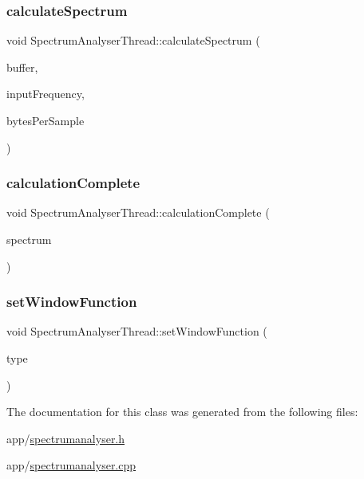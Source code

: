 \subsubsection{\texorpdfstring{calculate\+Spectrum}{calculateSpectrum}}
{\footnotesize\ttfamily void Spectrum\+Analyser\+Thread\+::calculate\+Spectrum (\begin{DoxyParamCaption}\item[{const Q\+Byte\+Array \&}]{buffer,  }\item[{int}]{input\+Frequency,  }\item[{int}]{bytes\+Per\+Sample }\end{DoxyParamCaption})\hspace{0.3cm}{\ttfamily [slot]}}

\hypertarget{class_spectrum_analyser_thread_adb2c9b6a5e017cd0805dac29c754b7f0}{}\label{class_spectrum_analyser_thread_adb2c9b6a5e017cd0805dac29c754b7f0} 
\subsubsection{\texorpdfstring{calculation\+Complete}{calculationComplete}}
{\footnotesize\ttfamily void Spectrum\+Analyser\+Thread\+::calculation\+Complete (\begin{DoxyParamCaption}\item[{const \hyperlink{class_frequency_spectrum}{Frequency\+Spectrum} \&}]{spectrum }\end{DoxyParamCaption})\hspace{0.3cm}{\ttfamily [signal]}}

\hypertarget{class_spectrum_analyser_thread_a823681736ef2719fbb6aec132a75b6cb}{}\label{class_spectrum_analyser_thread_a823681736ef2719fbb6aec132a75b6cb} 
\subsubsection{\texorpdfstring{set\+Window\+Function}{setWindowFunction}}
{\footnotesize\ttfamily void Spectrum\+Analyser\+Thread\+::set\+Window\+Function (\begin{DoxyParamCaption}\item[{\hyperlink{spectrum_8h_adae4545e1609513867a86cc5e91fc1d4}{Window\+Function}}]{type }\end{DoxyParamCaption})\hspace{0.3cm}{\ttfamily [slot]}}



The documentation for this class was generated from the following files\+:\begin{DoxyCompactItemize}
\item 
app/\hyperlink{spectrumanalyser_8h}{spectrumanalyser.\+h}\item 
app/\hyperlink{spectrumanalyser_8cpp}{spectrumanalyser.\+cpp}\end{DoxyCompactItemize}
